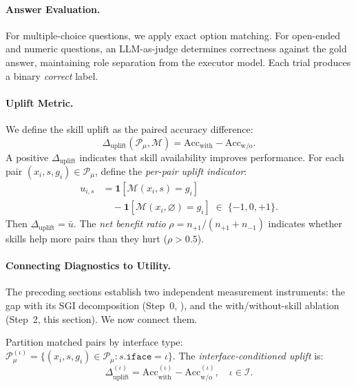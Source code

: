 \paragraph{Answer Evaluation.}
For multiple-choice questions, we apply exact option matching.
For open-ended and numeric questions, an LLM-as-judge determines correctness against the gold answer, maintaining role separation from the executor model.
Each trial produces a binary \emph{correct} label.

\paragraph{Uplift Metric.}
We define the skill uplift as the paired accuracy difference:
\begin{equation}
    \Delta_{\text{uplift}}(\mathcal{P}_\mu, \mathcal{M}) = \text{Acc}_{\text{with}} - \text{Acc}_{\text{w/o}}.
    \label{eq:uplift}
\end{equation}
A positive $\Delta_{\text{uplift}}$ indicates that skill availability improves performance.
For each pair $(x_i, s, g_i) \in \mathcal{P}_\mu$, define the \emph{per-pair uplift indicator}:
\begin{equation}
    \begin{aligned}
        u_{i,s}
        &= \mathbf{1}[\mathcal{M}(x_i, s) = g_i] \\
        &\quad - \mathbf{1}[\mathcal{M}(x_i, \varnothing) = g_i]
        \;\in\; \{-1, 0, +1\}.
    \end{aligned}
    \label{eq:per_pair}
\end{equation}
Then $\Delta_{\text{uplift}} = \bar{u}$.
The \emph{net benefit ratio} $\rho = n_{+1}/(n_{+1} + n_{-1})$ indicates whether skills help more pairs than they hurt ($\rho > 0.5$).

\paragraph{Connecting Diagnostics to Utility.}
The preceding sections establish two independent measurement instruments: the \rbu gap with its \textsc{SGI} decomposition (Step~0, ), and the with/without-skill ablation (Step~2, this section).
We now connect them.

Partition matched pairs by interface type: $\mathcal{P}_\mu^{(\iota)} = \{(x_i, s, g_i) \in \mathcal{P}_\mu : s.\texttt{iface} = \iota\}$.
The \emph{interface-conditioned uplift} is:
\begin{equation}
    \Delta_{\text{uplift}}^{(\iota)} = \text{Acc}_{\text{with}}^{(\iota)} - \text{Acc}_{\text{w/o}}^{(\iota)}, \quad \iota \in \mathcal{I}.
    \label{eq:cond_uplift}
\end{equation}

